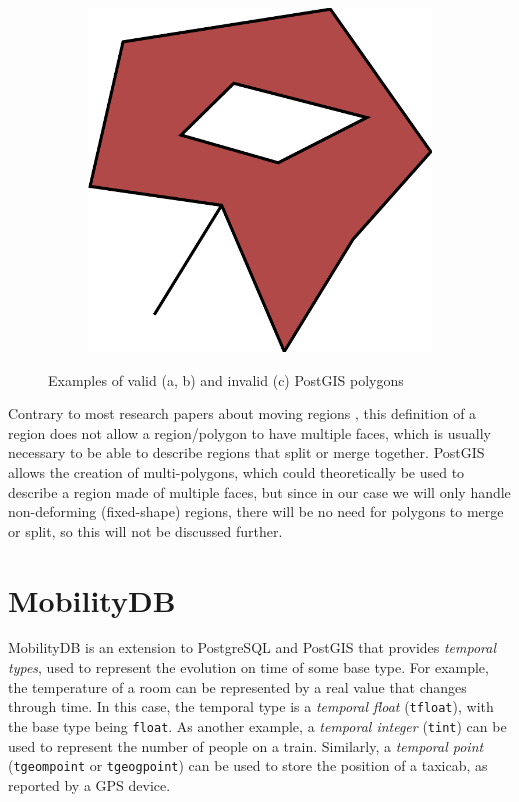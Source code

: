 \begin{figure}[h!]
\begin{subfigure}{.3\textwidth}
  \centering
  \includegraphics[width=.8\linewidth]{images/polygon_spike.pdf}
  \caption{}
  \label{fig:polygon_spike}
\end{subfigure}
\caption{Examples of valid (a, b) and invalid (c) PostGIS polygons}
\label{fig:postgis_polygon}
\end{figure}

Contrary to most research papers about moving regions \cite{polyhedra,model_structure_for_mod,moving_obj_foundation}, this definition of a region does not allow a region/polygon to have multiple faces, which is usually necessary to be able to describe regions that split or merge together. PostGIS allows the creation of multi-polygons, which could theoretically be used to describe a region made of multiple faces, but since in our case we will only handle non-deforming (fixed-shape) regions, there will be no need for polygons to merge or split, so this will not be discussed further.

\section{MobilityDB}
\label{section:mobilitydb}

MobilityDB \cite{mobilitydb} is an extension to PostgreSQL and PostGIS that provides \textit{temporal types}, used to represent the evolution on time of some base type. For example, the temperature of a room can be represented by a real value that changes through time. In this case, the temporal type is a \textit{temporal float} (\lstinline{tfloat}), with the base type being \lstinline{float}. As another example, a \textit{temporal integer} (\lstinline{tint}) can be used to represent the number of people on a train. Similarly, a \textit{temporal point} (\lstinline{tgeompoint} or \lstinline{tgeogpoint}) can be used to store the position of a taxicab, as reported by a GPS device.

